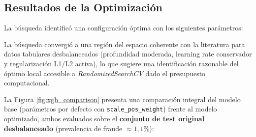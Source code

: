 \documentclass[12pt,a4paper]{report}
\begin{document}
\subsection{Resultados de la Optimización}

La búsqueda identificó una configuración óptima con los siguientes parámetros:

\begin{table}[H]
    \centering
    \caption{Parámetros Óptimos Identificados mediante RandomizedSearchCV (30 iteraciones, 3-fold CV, scoring \texttt{average\_precision})}
    \label{tab:hiperparametros_optimos}
\end{table}

La búsqueda convergió a una región del espacio coherente con la literatura para datos tabulares desbalanceados (profundidad moderada, learning rate conservador y regularización L1/L2 activa), lo que sugiere una identificación razonable del óptimo local accesible a \textit{RandomizedSearchCV} dado el presupuesto computacional.

La Figura \ref{fig:xgb_comparison} presenta una comparación integral del modelo base (parámetros por defecto con \texttt{scale\_pos\_weight}) frente al modelo optimizado, ambos evaluados sobre el \textbf{conjunto de test original desbalanceado} (prevalencia de fraude $\approx 1{,}1\%$):
\end{document}
